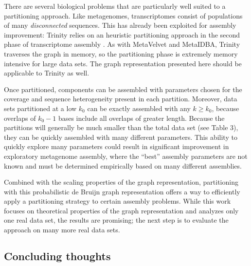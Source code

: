 \documentclass[draft]{pnastwo}
\begin{document}
\begin{article}

There are several biological problems that are particularly well
suited to a partitioning approach.  Like metagenomes, transcriptomes
consist of populations of many {\em disconnected} sequences.  This has
already been exploited for assembly improvement: Trinity relies on an
heuristic partitioning approach in the second phase of transcriptome assembly
\cite{trinity}.  As with MetaVelvet and MetaIDBA, Trinity
traverses the graph in memory, so the partitioning phase is extremely
memory intensive for large data sets\cite{metavelvet,pubmed21685107,trinity}.
The graph representation presented here should be applicable to Trinity
as well.

Once partitioned, components can be assembled with parameters chosen
for the coverage and sequence heterogeneity present in each partition.
Moreover, data sets partitioned at a low $k_0$ can be exactly
assembled with any $k \ge k_0$, because overlaps of $k_0-1$ bases
include all overlaps of greater length.  Because the partitions will
generally be much smaller than the total data set (see Table
3), 
they can be quickly assembled with many different
parameters.  This ability to quickly explore many parameters could
result in significant improvement in exploratory metagenome assembly,
where the ``best'' assembly parameters are not known and must be
determined empirically based on many different assemblies.


Combined with the scaling properties of the graph representation,
partitioning with this probabilistic de Bruijn graph representation
offers a way to efficiently apply a partitioning strategy to certain
assembly problems.  While this work focuses on theoretical properties
of the graph representation and analyzes only one real data set, the
results are promising; the next step is to evaluate the approach
on many more real data sets.

\subsection{Concluding thoughts}



\end{article}
\end{document}
